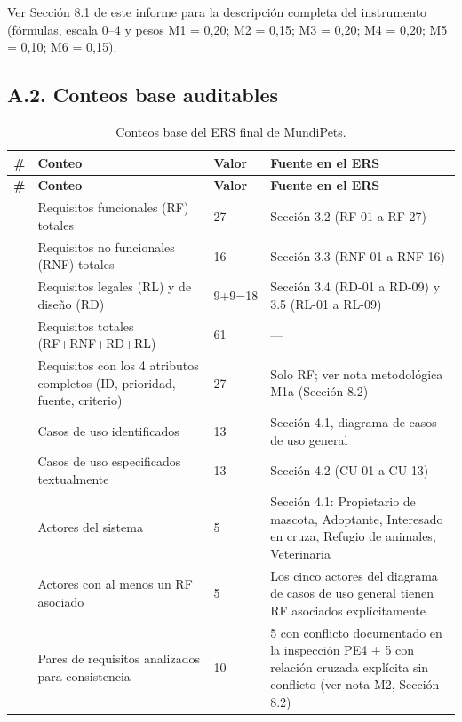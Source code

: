 \documentclass[journal,onecolumn]{IEEEtran}
\begin{document}
	Ver Sección 8.1 de este informe para la descripción completa del instrumento (fórmulas, escala 0--4 y pesos M1 = 0,20; M2 = 0,15; M3 = 0,20; M4 = 0,20; M5 = 0,10; M6 = 0,15).
	
	\subsection*{A.2. Conteos base auditables}
	
	\begin{longtable}{C{0.7cm} L{4.3cm} C{1.3cm} L{7.5cm}}
		\caption{Conteos base del ERS final de MundiPets.}\label{tab:conteos-base}\\
		\toprule
		\textbf{\#} & \textbf{Conteo} & \textbf{Valor} & \textbf{Fuente en el ERS} \\
		\midrule
		\endfirsthead
		\toprule
		\textbf{\#} & \textbf{Conteo} & \textbf{Valor} & \textbf{Fuente en el ERS} \\
		\midrule
		\endhead
		\bottomrule
		 & Requisitos funcionales (RF) totales & 27 & Sección 3.2 (RF-01 a RF-27) \\
		 & Requisitos no funcionales (RNF) totales & 16 & Sección 3.3 (RNF-01 a RNF-16) \\
		 & Requisitos legales (RL) y de diseño (RD) & 9+9=18 & Sección 3.4 (RD-01 a RD-09) y 3.5 (RL-01 a RL-09) \\
		 & Requisitos totales (RF+RNF+RD+RL) & 61 & --- \\
		 & Requisitos con los 4 atributos completos (ID, prioridad, fuente, criterio) & 27 & Solo RF; ver nota metodológica M1a (Sección 8.2) \\
		 & Casos de uso identificados & 13 & Sección 4.1, diagrama de casos de uso general \\
		 & Casos de uso especificados textualmente & 13 & Sección 4.2 (CU-01 a CU-13) \\
		 & Actores del sistema & 5 & Sección 4.1: Propietario de mascota, Adoptante, Interesado en cruza, Refugio de animales, Veterinaria \\
		 & Actores con al menos un RF asociado & 5 & Los cinco actores del diagrama de casos de uso general tienen RF asociados explícitamente \\
		 & Pares de requisitos analizados para consistencia & 10 & 5 con conflicto documentado en la inspección PE4 + 5 con relación cruzada explícita sin conflicto (ver nota M2, Sección 8.2) \\

\end{longtable}
\end{document}
